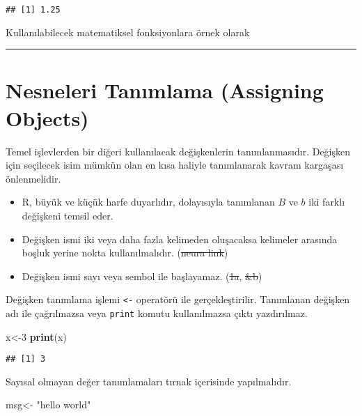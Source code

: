 \documentclass[
]{book}
\newenvironment{Shaded}{\begin{snugshade}}{\end{snugshade}}
\newcommand{\DecValTok}[1]{\textcolor[rgb]{0.00,0.00,0.81}{#1}}
\newcommand{\KeywordTok}[1]{\textcolor[rgb]{0.13,0.29,0.53}{\textbf{#1}}}
\newcommand{\NormalTok}[1]{#1}
\newcommand{\StringTok}[1]{\textcolor[rgb]{0.31,0.60,0.02}{#1}}
\begin{document}
\begin{verbatim}
## [1] 1.25
\end{verbatim}

Kullanılabilecek matematiksel fonksiyonlara örnek olarak \citep{Crawley2012}

\begin{center}\rule{0.5\linewidth}{0.5pt}\end{center}

\hypertarget{nesneleri-tanux131mlama-assigning-objects}{%
\section{Nesneleri Tanımlama (Assigning Objects)}\label{nesneleri-tanux131mlama-assigning-objects}}

Temel işlevlerden bir diğeri kullanılacak değişkenlerin tanımlanmasıdır. Değişken için seçilecek isim mümkün olan en kısa haliyle tanımlanarak kavram kargaşası önlenmelidir.

\begin{itemize}
\item
  R, büyük ve küçük harfe duyarlıdır, dolayısıyla tanımlanan \(B\) ve \(b\) iki farklı değişkeni temsil eder.
\item
  Değişken ismi iki veya daha fazla kelimeden oluşacaksa kelimeler arasında boşluk yerine nokta kullanılmalıdır. (\sout{neura link})
\item
  Değişken ismi sayı veya sembol ile başlayamaz. (\sout{1a}, \sout{\&b})
\end{itemize}

Değişken tanımlama işlemi \texttt{\textless{}-} operatörü ile gerçekleştirilir. Tanımlanan değişken adı ile çağrılmazsa veya \texttt{print} komutu kullanılmazsa çıktı yazdırılmaz.

\begin{Shaded}
\begin{Highlighting}[]
\NormalTok{x<-}\DecValTok{3}
\KeywordTok{print}\NormalTok{(x)}
\end{Highlighting}
\end{Shaded}

\begin{verbatim}
## [1] 3
\end{verbatim}

Sayısal olmayan değer tanımlamaları tırnak içerisinde yapılmalıdır.

\begin{Shaded}
\begin{Highlighting}[]
\NormalTok{msg<-}\StringTok{ "hello world"}
\end{Highlighting}
\end{Shaded}
\end{document}
